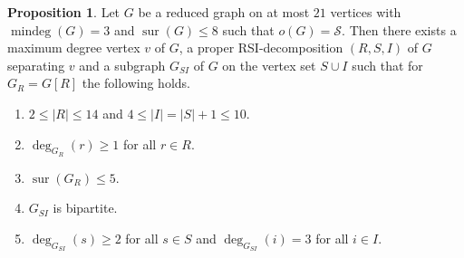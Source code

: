 \documentclass[a4paper,11pt,oneside]{scrartcl}
\theoremstyle{definition}
\newtheorem{proposition}[definition]{Proposition}
\theoremstyle{remark}
\DeclareMathOperator{\mindeg}{mindeg}
\DeclareMathOperator{\sur}{sur}
\begin{document}
\begin{proposition}\label{proposition:preprocessed_RSI}
    Let $G$ be a reduced graph on at most $21$ vertices with $\mindeg(G) = 3$ and $\sur(G) \leq 8$ such that $o(G) = \mathcal S$. Then there exists a maximum degree vertex $v$ of $G$, a proper RSI-decomposition $(R,S,I)$ of $G$ separating $v$ and a subgraph $G_{SI}$ of $G$ on the vertex set $S \cup I$ such that for $G_R = G[R]$ the following holds.
    \begin{enumerate}
        \item\label{item:preprocessed_RSI:vert} 
            $2 \leq |R| \leq 14$ and $4 \leq |I| = |S| + 1 \leq 10$.
        \item\label{item:preprocessed_RSI:degGR} 
            $\deg_{G_{R}}(r) \geq 1$ for all $r \in R$.
        \item\label{item:preprocessed_RSI:sur_in_GR}
            $\sur(G_R) \leq 5$.
        \item\label{item:preprocessed_RSI:bipartite} 
            $G_{SI}$ is bipartite. 
        \item\label{item:preprocessed_RSI:degGSI} 
            $\deg_{G_{SI}}(s) \geq 2$ for all $s \in S$ and $\deg_{G_{SI}}(i) = 3$ for all $i \in I$.
    \end{enumerate}
\end{proposition}
\end{document}

